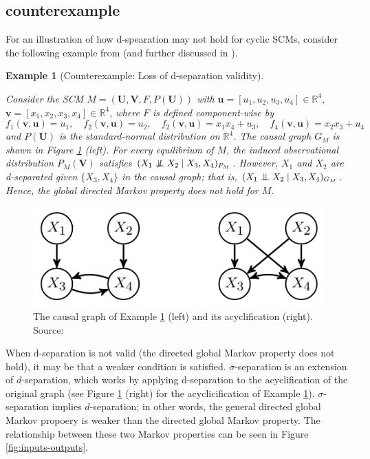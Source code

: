 \documentclass[letterpaper,10pt]{article}
\newtheorem{example}{Example}
\newcommand{\CI}{\mathrel{\perp\mspace{-10mu}\perp}}
\newcommand{\nCI}{\centernot{\CI}}
\newcommand\R{\mathbb{R}}
\begin{document}
\subsection{counterexample}

For an illustration of how d-spearation may not hold for cyclic SCMs, consider the following example from \cite{Acyclification} (and further discussed in \cite{Foundations}).

\begin{example}[Counterexample: Loss of d-separation validity]
\label{counter}

Consider the SCM $M=(\mathbf{U},\mathbf{V},F,P(\mathbf{U}))$ with $\mathbf{u}=[u_1,u_2,u_3,u_4]\in \R^4$, $\mathbf{v}=[x_1,x_2,x_3,x_4]\in\R^4$, where $F$ is defined component-wise by
\[
f_1(\mathbf{v},\mathbf{u}) = u_1, \quad f_2(\mathbf{v},\mathbf{u}) = u_2, \quad
f_2(\mathbf{v},\mathbf{u}) = x_1x_4+u_3, \quad f_4(\mathbf{v},\mathbf{u}) = x_2x_3+u_4 
\]
and $P(\mathbf{U})$ is the standard-normal distribution on $\R^4$. The causal graph $G_M$ is shown in Figure \ref{fig:acyclification} (left). For every equilibrium of $M$, the induced observational distribution $P_M(\mathbf{V})$ satisfies $(X_1 \nCI X_2 \mid X_3,X_4)_{P_M}$.
However, $X_1$ and $X_2$ are d-separated given $\{X_3,X_4\}$ in the causal graph; that is, $(X_1 \CI X_2 \mid X_3,X_4)_{G_M}$. 
Hence, the global directed Markov property does not hold for $M$.
\end{example}

\begin{figure}
\centering
\includegraphics[width=.4\linewidth]{pics/cited/acyclification_Foundations.png}
\caption{The causal graph of Example \ref{counter} (left) and its acyclification (right). Source: \cite{Foundations}}
\label{fig:acyclification}
\end{figure}

When d-separation is not valid (the directed global Markov property does not hold), it may be that a weaker condition is satisfied. $\sigma$-separation is an extension of $d$-separation, which works by applying d-separation to the acyclification of the original graph (see Figure \ref{fig:acyclification} (right) for the acyclicification of Example \ref{counter}). $\sigma$-separation implies $d$-separation; in other words, the general directed global Markov propoery is weaker than the directed global Markov property. The relationship between these two Markov properties can be seen in Figure \ref{fig:inputs-outputs}.
\end{document}
